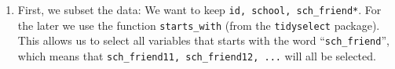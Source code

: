 \documentclass[]{book}
\newenvironment{Shaded}{\begin{snugshade}}{\end{snugshade}}
\newcommand{\KeywordTok}[1]{\textcolor[rgb]{0.13,0.29,0.53}{\textbf{#1}}}
\newcommand{\StringTok}[1]{\textcolor[rgb]{0.31,0.60,0.02}{#1}}
\newcommand{\OperatorTok}[1]{\textcolor[rgb]{0.81,0.36,0.00}{\textbf{#1}}}
\newcommand{\NormalTok}[1]{#1}
\theoremstyle{definition}
\theoremstyle{definition}
\theoremstyle{definition}
\theoremstyle{remark}
\begin{document}
\begin{enumerate}
\def\labelenumi{\arabic{enumi}.}
\item
  First, we subset the data: We want to keep
  \texttt{id,\ school,\ sch\_friend*}. For the later we use the function
  \texttt{starts\_with} (from the \texttt{tidyselect} package). This
  allows us to select all variables that starts with the word
  ``\texttt{sch\_friend}'', which means that
  \texttt{sch\_friend11,\ sch\_friend12,\ ...} will all be selected.

\begin{Shaded}
\end{Shaded}


\end{enumerate}
\end{document}
